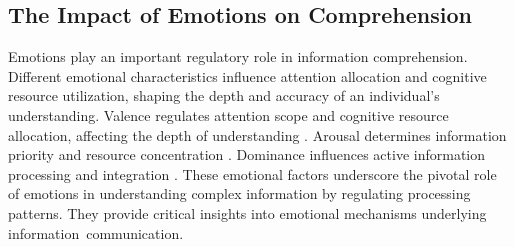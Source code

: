 \subsection{The Impact of Emotions on Comprehension}
Emotions play an important regulatory role in information comprehension. Different emotional characteristics influence attention allocation and cognitive resource utilization, shaping the depth and accuracy of an individual’s understanding. Valence regulates attention scope and cognitive resource allocation, affecting the depth of understanding \cite{egidi2012emotional, megalakaki2019effects}. Arousal determines information priority and resource concentration \cite{mather2011arousal, tyng2017influences}. Dominance influences active information processing and integration \cite{mehrabian1996pleasure, gross1998emerging}. These emotional factors underscore the pivotal role of emotions in understanding complex information by regulating processing patterns. They provide critical insights into emotional mechanisms underlying information~communication. 


